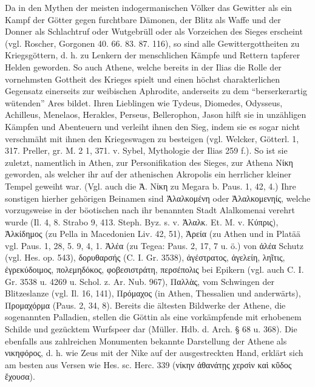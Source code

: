 \documentclass[a4paper, 11pt, oneside]{article}
\begin{document}
Da in den Mythen der meisten indogermanischen Völker das Gewitter als ein Kampf der Götter gegen furchtbare Dämonen, der Blitz als Waffe und der Donner als Schlachtruf oder Wutgebrüll oder als Vorzeichen des Sieges erscheint (vgl. Roscher, Gorgonen 40. 66. 83. 87. 116), so sind alle Gewittergottheiten zu Kriegsgöttern, d. h. zu Lenkern der menschlichen Kämpfe und Rettern tapferer Helden geworden. So auch Athene, welche bereits in der Ilias die Rolle der vornehmsten Gottheit des Krieges spielt und einen höchst charakterlichen Gegensatz einerseits zur weibischen Aphrodite, anderseits zu dem "`berserkerartig wütenden"' Ares bildet. Ihren Lieblingen wie Tydeus, Diomedes, Odysseus, Achilleus, Menelaos, Herakles, Perseus, Bellerophon, Jason hilft sie in unzähligen Kämpfen und Abenteuern und verleiht ihnen den Sieg, indem sie es sogar nicht verschmäht mit ihnen den Kriegeswagen zu besteigen (vgl. Welcker, Götterl. 1, 317. Preller, gr. M. 2 1, 371. v. Sybel, Mythologie der Ilias 259 f.). So ist sie zuletzt, namentlich in Athen, zur Personifikation des Sieges, zur Athena Νίκη geworden, als welcher ihr auf der athenischen Akropolis ein herrlicher kleiner Tempel geweiht war. (Vgl. auch die Ἀ. Νίκη zu Megara b. Paus. 1, 42, 4.) Ihre sonstigen hierher gehörigen Beinamen sind Ἀλαλκομένη oder Ἀλαλκομενηίς, welche vorzugsweise in der böotischen nach ihr benannten Stadt Alalkomenai verehrt wurde (Il. 4, 8. Strabo 9, 413. Steph. Byz. s. v. Ἀλαλκ. Et. M. v. Κύπρις), Ἀλκίδημος (zu Pella in Macedonien Liv. 42, 51), Ἀρεία (zu Athen und in Platää vgl. Paus. 1, 28, 5. 9, 4, 1. Ἀλέα (zu Tegea: Paus. 2, 17, 7 u. ö.) von ἀλέα Schutz (vgl. Hes. op. 543), δορυθαρσής (C. I. Gr. 3538), ἀγέστρατος, ἀγελείη, ληῖτις, ἐγρεκύδοιμος, πολεμηδόκος, φοβεσιστράτη, περσέπολις bei Epikern (vgl. auch C. I. Gr. 3538 u. 4269 u. Schol. z. Ar. Nub. 967), Παλλὰς, vom Schwingen der Blitzeslanze (vgl. Il. 16, 141), Πρόμαχος (in Athen, Thessalien und anderwärts), Προμαχόρμα (Paus. 2, 34, 8). Bereits die ältesten Bildwerke der Athene, die sogenannten Palladien, stellen die Göttin als eine vorkämpfende mit erhobenem Schilde und gezücktem Wurfspeer dar (Müller. Hdb. d. Arch. § 68 u. 368). Die ebenfalls aus zahlreichen Monumenten bekannte Darstellung der Athene als νικηφόρος, d. h. wie Zeus mit der Nike auf der ausgestreckten Hand, erklärt sich am besten aus Versen wie Hes. sc. Herc. 339 (νίκην ἀθανάτῃς χερσὶν καὶ κῦδος ἔχουσα).
\end{document}
